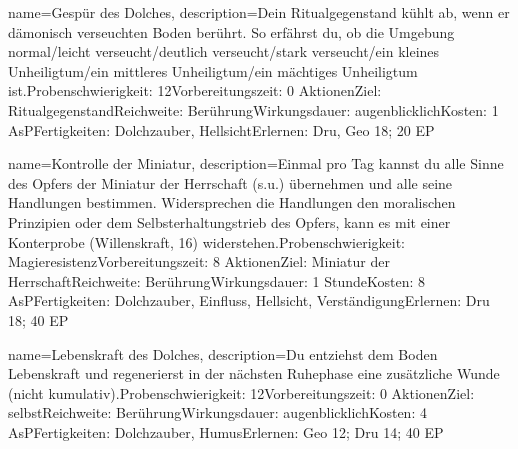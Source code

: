 {
    name={Gespür des Dolches},
    description={Dein Ritualgegenstand kühlt ab, wenn er dämonisch verseuchten Boden berührt. So erfährst du, ob die Umgebung normal/leicht verseucht/deutlich verseucht/stark verseucht/ein kleines Unheiligtum/ein mittleres Unheiligtum/ein mächtiges Unheiligtum ist.\newline Probenschwierigkeit: 12\newline Vorbereitungszeit: 0 Aktionen\newline Ziel: Ritualgegenstand\newline Reichweite: Berührung\newline Wirkungsdauer: augenblicklich\newline Kosten: 1 AsP\newline Fertigkeiten: Dolchzauber, Hellsicht\newline Erlernen: Dru, Geo 18; 20 EP}
}


{
    name={Kontrolle der Miniatur},
    description={Einmal pro Tag kannst du alle Sinne des Opfers der Miniatur der Herrschaft (s.u.) übernehmen und alle seine Handlungen bestimmen. Widersprechen die Handlungen den moralischen Prinzipien oder dem Selbsterhaltungstrieb des Opfers, kann es mit einer Konterprobe (Willenskraft, 16) widerstehen.\newline Probenschwierigkeit: Magieresistenz\newline Vorbereitungszeit: 8 Aktionen\newline Ziel: Miniatur der Herrschaft\newline Reichweite: Berührung\newline Wirkungsdauer: 1 Stunde\newline Kosten: 8 AsP\newline Fertigkeiten: Dolchzauber, Einfluss, Hellsicht, Verständigung\newline Erlernen: Dru 18; 40 EP}
}


{
    name={Lebenskraft des Dolches},
    description={Du entziehst dem Boden Lebenskraft und regenerierst in der nächsten Ruhephase eine zusätzliche Wunde (nicht kumulativ).\newline Probenschwierigkeit: 12\newline Vorbereitungszeit: 0 Aktionen\newline Ziel: selbst\newline Reichweite: Berührung\newline Wirkungsdauer: augenblicklich\newline Kosten: 4 AsP\newline Fertigkeiten: Dolchzauber, Humus\newline Erlernen: Geo 12; Dru 14; 40 EP}
}


